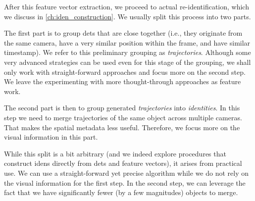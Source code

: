 After this feature vector extraction, we proceed to actual re-identification, which we discuss in \autoref{ch:iden_construction}. We usually split this process into two parts.

The first part is to group \glspl{det} that are close together (i.e., they originate from the same camera, have a very similar position within the frame, and have similar timestamp). We refer to this preliminary grouping as \emph{trajectories}. Although some very advanced strategies can be used even for this stage of the grouping, we shall only work with straight-forward approaches and focus more on the second step. We leave the experimenting with more thought-through approaches as feature work.

The second part is then to group generated \emph{trajectories} into \emph{identities}. In this step we need to merge trajectories of the same object across multiple cameras. That makes the spatial metadata less useful. Therefore, we focus more on the visual information in this part.

While this split is a bit arbitrary (and we indeed explore procedures that construct \glspl{iden} directly from \glspl{det} and feature vectors), it arises from practical use. We can use a straight-forward yet precise algorithm while we do not rely on the visual information for the first step. In the second step, we can leverage the fact that we have significantly fewer (by a few magnitudes) objects to merge.